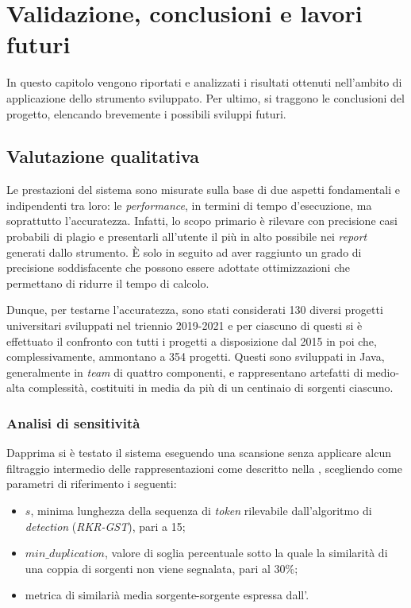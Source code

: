 \chapter{Validazione, conclusioni e lavori futuri}
\label{chapter:validation}
In questo capitolo vengono riportati e analizzati i risultati ottenuti nell'ambito di applicazione dello strumento sviluppato.
%
Per ultimo, si traggono le conclusioni del progetto, elencando brevemente i possibili sviluppi futuri.

\section{Valutazione qualitativa}
Le prestazioni del sistema sono misurate sulla base di due aspetti fondamentali e indipendenti tra loro: le \textit{performance}, in termini di tempo d'esecuzione, ma soprattutto l'accuratezza.
%
Infatti, lo scopo primario è rilevare con precisione casi probabili di plagio e presentarli all'utente il più in alto possibile nei \textit{report} generati dallo strumento.
%
\`E solo in seguito ad aver raggiunto un grado di precisione soddisfacente che possono essere adottate ottimizzazioni che permettano di ridurre il tempo di calcolo.

Dunque, per testarne l'accuratezza, sono stati considerati 130 diversi progetti universitari sviluppati nel triennio 2019-2021 e per ciascuno di questi si è effettuato il confronto con tutti i progetti a disposizione dal 2015 in poi che, complessivamente, ammontano a 354 progetti.
%
Questi sono sviluppati in Java, generalmente in \textit{team} di quattro componenti, e rappresentano artefatti di medio-alta complessità, costituiti in media da più di un centinaio di sorgenti ciascuno.

\subsection{Analisi di sensitività}
Dapprima si è testato il sistema eseguendo una scansione senza applicare alcun filtraggio intermedio delle rappresentazioni come descritto nella , scegliendo come parametri di riferimento i seguenti:
\begin{itemize}
    \item $s$, minima lunghezza della sequenza di \textit{token} rilevabile dall'algoritmo di \textit{detection} (\textit{RKR-GST}), pari a 15;
    \item $min\_duplication$, valore di soglia percentuale sotto la quale la similarità di una coppia di sorgenti non viene segnalata, pari al 30\%;
    \item metrica di similarià media sorgente-sorgente espressa dall'.
\end{itemize}

